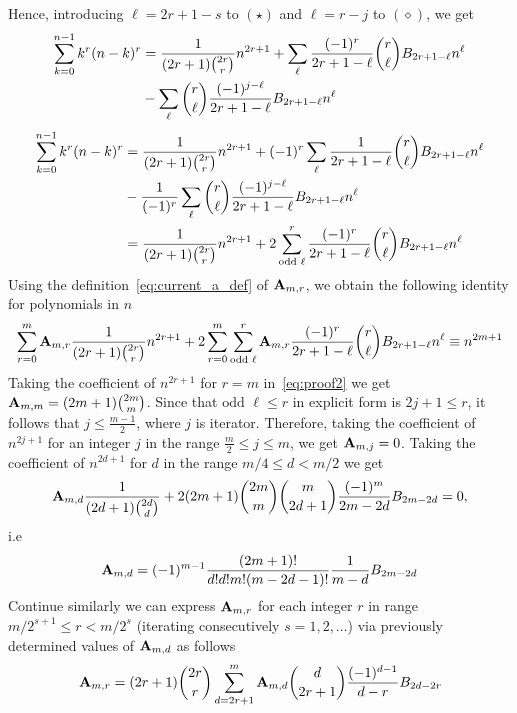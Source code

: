 Hence, introducing $\ell=2r+1-s$ to $(\star)$ and $\ell=r-j$ to $(\diamond)$, we get
\begin{equation*}
    \begin{split}
        \sum_{k=0}^{n-1} k^r (n-k)^r
        &=\frac{1}{(2r+1) \binom{2r}{r}} n^{2r+1}
        +\sum_{\ell} \frac{(-1)^r}{2r+1-\ell} \binom{r}{\ell} {B}\sb{2r+1-\ell} n^{\ell} \\
        &-\sum_{\ell} \binom{r}{\ell} \frac{(-1)^{j-\ell}}{2r+1-\ell} {B}\sb{2r+1-\ell} n^{\ell}
    \end{split}
\end{equation*}
\begin{equation*}
    \begin{split}
        \sum_{k=0}^{n-1} k^r (n-k)^r
        &=\frac{1}{(2r+1) \binom{2r}{r}} n^{2r+1}
        +(-1)^{r} \sum_{\ell} \frac{1}{2r+1-\ell} \binom{r}{\ell} {B}\sb{2r+1-\ell} n^{\ell} \\
        &-\frac{1}{(-1)^{r}} \sum_{\ell} \binom{r}{\ell} \frac{(-1)^{j-\ell}}{2r+1-\ell} {B}\sb{2r+1-\ell} n^{\ell} \\
        &=\frac{1}{(2r+1) \binom{2r}{r}}n^{2r+1}
        +2 \sum_{\text{odd } \ell}^{r} \frac{(-1)^r}{2r+1-\ell} \binom{r}{\ell} {B}\sb{2r+1-\ell} n^{\ell}
    \end{split}
\end{equation*}
Using the definition~\eqref{eq:current_a_def} of ${\mathbf{A}} \sb{m,r}$, we obtain the following identity for polynomials in $n$
\begin{equation}
    \label{eq:proof2}
    \sum_{r=0}^{m} {\mathbf{A}} \sb{m,r} \frac{1}{(2r+1) \binom{2r}{r}} n^{2r+1}
    +2 \sum_{r=0}^{m}\sum_{\text{odd } \ell}^{r} {\mathbf{A}} \sb{m,r} \frac{(-1)^r}{2r+1-\ell}
    \binom{r}{\ell} {B}\sb{2r+1-\ell} n^{\ell}
    \equiv
    n^{2m+1}
\end{equation}
Taking the coefficient of $n^{2r+1}$ for $r=m$ in~\eqref{eq:proof2} we get ${\mathbf{A}} \sb{m,m} = (2m+1) \binom{2m}{m}$.
Since that $\text{odd } \ell \leq r$ in explicit form is $2j + 1 \leq r$, it follows that $j \leq \frac{m-1}{2}$,
where $j$ is iterator.
Therefore, taking the coefficient of $n^{2j+1}$ for an integer $j$ in the range $\frac{m}{2} \leq j \leq m$,
we get ${\mathbf{A}} \sb{m,j} = 0$.
Taking the coefficient of $n^{2d+1}$ for $d$ in the range $m/4 \leq d < m/2$ we get
\begin{equation*}
    {\mathbf{A}} \sb{m,d} \frac{1}{(2d+1) \binom{2d}{d}}
    +2 (2m+1) \binom{2m}{m} \binom{m}{2d+1} \frac{(-1)^m}{2m-2d} {B}\sb{2m-2d} = 0,
\end{equation*}
i.e
\begin{equation*}
    {\mathbf{A}} \sb{m,d} = (-1)^{m-1} \frac{(2m+1)!}{d!d!m!(m-2d-1)!} \frac{1}{m-d} {B}\sb{2m-2d}
\end{equation*}
Continue similarly we can express ${\mathbf{A}} \sb{m,r}$ for each integer $r$ in range $m/2^{s+1}\leq r < m/2^s$
(iterating consecutively $s=1,2,\ldots$) via previously determined values of ${\mathbf{A}} \sb{m,d}$ as follows
\begin{equation*}
    {\mathbf{A}} \sb{m,r} =
    (2r+1) \binom{2r}{r} \sum_{d=2r+1}^{m} {\mathbf{A}} \sb{m,d} \binom{d}{2r+1} \frac{(-1)^{d-1}}{d-r}
    {B}\sb{2d-2r}
\end{equation*}